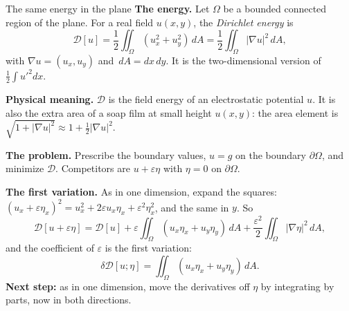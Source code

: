 \documentclass[11pt]{beamer}
\newcommand{\dd}{\,d}
\newcommand{\D}{\mathcal D}
\begin{document}
\begin{frame}[allowframebreaks=1.00]{The same energy in the plane}
\small
\textbf{The energy.} Let \(\Omega\) be a bounded connected region of the plane. For a real field \(u(x,y)\), the
\emph{Dirichlet energy} is
\begin{equation}
 \D[u]=\frac12\iint_\Omega(u_x^2+u_y^2)\dd A
       =\frac12\iint_\Omega|\nabla u|^2\dd A,\label{eq:dirichlet-energy}
\end{equation}
with \(\nabla u=(u_x,u_y)\) and \(\dd A=dx\,dy\). It is the two-dimensional version of
\(\frac12\int u'^2dx\).

\textbf{Physical meaning.} \(\D\) is the field energy of an electrostatic potential \(u\). It is also the extra
area of a soap film at small height \(u(x,y)\): the area element is \(\sqrt{1+|\nabla u|^2}\approx1+\tfrac12|\nabla u|^2\).

\textbf{The problem.} Prescribe the boundary values, \(u=g\) on the boundary \(\partial\Omega\), and minimize \(\D\).
Competitors are \(u+\varepsilon\eta\) with \(\eta=0\) on \(\partial\Omega\).
\par\framebreak\par
\textbf{The first variation.} As in one dimension, expand the squares:
\((u_x+\varepsilon\eta_x)^2=u_x^2+2\varepsilon u_x\eta_x+\varepsilon^2\eta_x^2\), and the same in \(y\). So
\[
 \D[u+\varepsilon\eta]=\D[u]+\varepsilon\iint_\Omega(u_x\eta_x+u_y\eta_y)\dd A+\frac{\varepsilon^2}2\iint_\Omega|\nabla\eta|^2\dd A,
\]
and the coefficient of \(\varepsilon\) is the first variation:
\[
 \delta\D[u;\eta]=\iint_\Omega(u_x\eta_x+u_y\eta_y)\dd A .
\]
\textbf{Next step:} as in one dimension, move the derivatives off \(\eta\) by integrating by parts, now in
both directions.
\end{frame}
\end{document}
